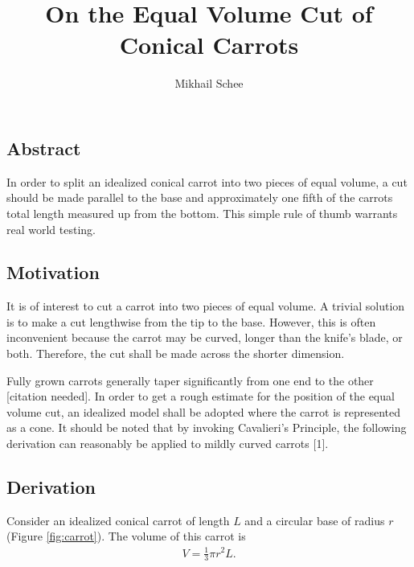 \documentclass[a4paper, 12pt]{article}
\begin{document}

\title{On the Equal Volume Cut of Conical Carrots}
\author{Mikhail Schee}
\date{}
\maketitle


\subsection*{Abstract}
\indent In order to split an idealized conical carrot into two pieces of equal volume, a cut should be made parallel to the base and approximately one fifth of the carrots total length measured up from the bottom. This simple rule of thumb warrants real world testing.

\subsection*{Motivation}
\indent It is of interest to cut a carrot into two pieces of equal volume. A trivial solution is to make a cut lengthwise from the tip to the base. However, this is often inconvenient because the carrot may be curved, longer than the knife's blade, or both. Therefore, the cut shall be made across the shorter dimension. 

Fully grown carrots generally taper significantly from one end to the other [citation needed]. In order to get a rough estimate for the position of the equal volume cut, an idealized model shall be adopted where the carrot is represented as a cone. It should be noted that by invoking Cavalieri's Principle, the following derivation can reasonably be applied to mildly curved carrots [1]. %

\subsection*{Derivation}

\indent Consider an idealized conical carrot of length $L$ and a circular base of radius $r$ (Figure \ref{fig:carrot}). The volume of this carrot is
	\begin{align}\label{V}
		V = \frac{1}{3}\pi r^2 L.
	\end{align}

\end{document}
